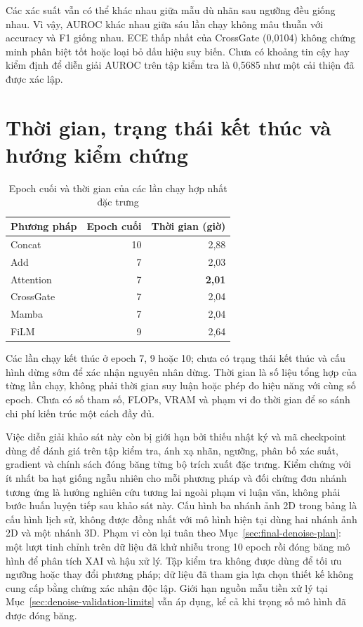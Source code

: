 \documentclass[14pt,a4paper,oneside]{extreport}
\begin{document}
Các xác suất vẫn có thể khác nhau giữa mẫu dù nhãn sau ngưỡng đều
giống nhau. Vì vậy, AUROC khác nhau giữa sáu lần chạy không mâu thuẫn với
accuracy và F1 giống nhau. ECE thấp nhất của CrossGate (0,0104)
không chứng minh phân biệt tốt hoặc loại bỏ dấu hiệu suy biến.
Chưa có khoảng tin cậy hay kiểm định để diễn giải AUROC trên tập kiểm tra là 0,5685
như một cải thiện đã được xác lập.
\FloatBarrier

\section{Thời gian, trạng thái kết thúc và hướng kiểm chứng}
\begin{table}[htbp]
  \centering
  \caption{Epoch cuối và thời gian của các lần chạy hợp nhất đặc trưng}
  \label{tab:fusion-runtime}
  \begin{tabular}{@{}lrr@{}}
    \toprule Phương pháp & Epoch cuối & Thời gian (giờ)\\ \midrule
    Concat & 10 & 2,88\\
    Add & 7 & 2,03\\
    Attention & 7 & \textbf{2,01}\\
    CrossGate & 7 & 2,04\\
    Mamba & 7 & 2,04\\
    FiLM & 9 & 2,64\\
    \bottomrule
  \end{tabular}
\end{table}
Các lần chạy kết thúc ở epoch 7, 9 hoặc 10; chưa có trạng thái kết thúc
và cấu hình dừng sớm để xác nhận nguyên nhân dừng. Thời gian
là số liệu tổng hợp của từng lần chạy, không phải thời gian suy luận hoặc
phép đo hiệu năng với cùng số epoch. Chưa có số tham số, FLOPs, VRAM và phạm vi
đo thời gian để so sánh chi phí kiến trúc một cách đầy đủ.

Việc diễn giải khảo sát này còn bị giới hạn bởi thiếu nhật ký và mã
checkpoint dùng để đánh giá trên tập kiểm tra, ánh xạ nhãn, ngưỡng,
phân bố xác suất, gradient và chính sách đóng băng từng bộ trích xuất
đặc trưng. Kiểm chứng với ít nhất ba hạt giống ngẫu nhiên cho mỗi phương
pháp và đối chứng đơn nhánh tương ứng là hướng nghiên cứu tương lai ngoài
phạm vi luận văn, không phải bước huấn luyện tiếp sau khảo sát này.
Cấu hình ba nhánh ảnh 2D trong bảng là cấu hình lịch sử, không được
đồng nhất với mô hình hiện tại dùng hai nhánh ảnh 2D và một nhánh 3D.
Phạm vi còn lại tuân theo Mục~\ref{sec:final-denoise-plan}: một lượt
tinh chỉnh trên dữ liệu đã khử nhiễu trong 10 epoch rồi đóng băng mô hình
để phân tích XAI và hậu xử lý. Tập kiểm tra không được dùng để tối ưu
ngưỡng hoặc thay đổi phương pháp; dữ liệu đã tham gia lựa chọn thiết kế
không cung cấp bằng chứng xác nhận độc lập. Giới hạn nguồn mẫu tiền xử lý
tại Mục~\ref{sec:denoise-validation-limits} vẫn áp dụng, kể cả khi trọng số
mô hình đã được đóng băng. \FloatBarrier
\end{document}
